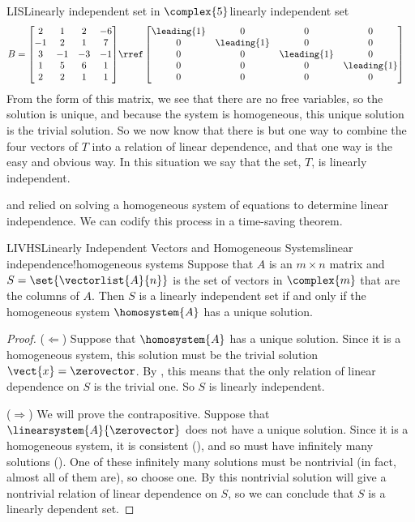 \begin{example}{LIS}{Linearly independent set in $\complex{5}$}{linearly independent set}
\begin{align*}
B=
\begin{bmatrix}
2&1&2&-6\\
-1&2&1&7\\
3&-1&-3&-1\\
1&5&6&1\\
2&2&1&1
\end{bmatrix}
&\rref
\begin{bmatrix}
\leading{1}&0&0&0\\
0&\leading{1}&0&0\\
0&0&\leading{1}&0\\
0&0&0&\leading{1}\\
0&0&0&0
\end{bmatrix}
\end{align*}
%
From the form of this matrix, we see that there are no free variables, so the solution is unique, and because the system is homogeneous, this unique solution is the trivial solution.  So we now know that there is but one way to combine the four vectors of $T$ into a relation of linear dependence, and that one way is the easy and obvious way.  In this situation we say that the set, $T$, is linearly independent.
%
\end{example}
%
 and  relied on solving a homogeneous system of equations to determine linear independence.  We can codify this process in a time-saving theorem.
%
\begin{theorem}{LIVHS}{Linearly Independent Vectors and Homogeneous Systems}{linear independence!homogeneous systems}
Suppose that $A$ is an $m\times n$ matrix and $S=\set{\vectorlist{A}{n}}$ is the set of vectors in $\complex{m}$ that are the columns of $A$.  Then $S$ is a linearly independent set if and only if the homogeneous system $\homosystem{A}$ has a unique solution.
\end{theorem}
%
\begin{proof}
($\Leftarrow$)  Suppose that $\homosystem{A}$ has a unique solution.  Since it is a homogeneous system, this solution must be the trivial solution $\vect{x}=\zerovector$.  By , this means that the only relation of linear dependence on $S$ is the trivial one.  So $S$ is linearly independent.\par
%
($\Rightarrow$)  We will prove the contrapositive.  Suppose that $\linearsystem{A}{\zerovector}$ does not have a unique solution.  Since it is a homogeneous system, it is consistent (), and so must have infinitely many solutions ().  One of these infinitely many solutions must be nontrivial (in fact, almost all of them are), so choose one.  By  this nontrivial solution will give a nontrivial relation of linear dependence on $S$, so we can conclude that $S$ is a linearly dependent set.
\end{proof}
